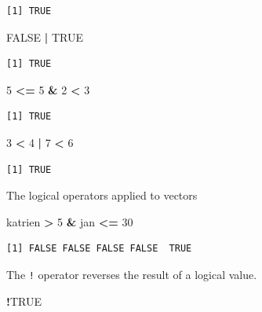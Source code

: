 \documentclass[
]{book}
\newenvironment{Shaded}{\begin{snugshade}}{\end{snugshade}}
\newcommand{\DecValTok}[1]{\textcolor[rgb]{0.00,0.00,0.81}{#1}}
\newcommand{\NormalTok}[1]{#1}
\newcommand{\OperatorTok}[1]{\textcolor[rgb]{0.81,0.36,0.00}{\textbf{#1}}}
\newcommand{\OtherTok}[1]{\textcolor[rgb]{0.56,0.35,0.01}{#1}}
\newcommand{\StringTok}[1]{\textcolor[rgb]{0.31,0.60,0.02}{#1}}
\begin{document}
\begin{verbatim}
[1] TRUE
\end{verbatim}

\begin{Shaded}
\begin{Highlighting}[]
\OtherTok{FALSE} \OperatorTok{|}\StringTok{ }\OtherTok{TRUE}
\end{Highlighting}
\end{Shaded}

\begin{verbatim}
[1] TRUE
\end{verbatim}

\begin{Shaded}
\begin{Highlighting}[]
\DecValTok{5} \OperatorTok{<=}\StringTok{ }\DecValTok{5} \OperatorTok{&}\StringTok{ }\DecValTok{2} \OperatorTok{<}\StringTok{ }\DecValTok{3}
\end{Highlighting}
\end{Shaded}

\begin{verbatim}
[1] TRUE
\end{verbatim}

\begin{Shaded}
\begin{Highlighting}[]
\DecValTok{3} \OperatorTok{<}\StringTok{ }\DecValTok{4} \OperatorTok{|}\StringTok{ }\DecValTok{7} \OperatorTok{<}\StringTok{ }\DecValTok{6}
\end{Highlighting}
\end{Shaded}

\begin{verbatim}
[1] TRUE
\end{verbatim}

The logical operators applied to vectors

\begin{Shaded}
\begin{Highlighting}[]
\NormalTok{katrien }\OperatorTok{>}\StringTok{ }\DecValTok{5} \OperatorTok{&}\StringTok{ }\NormalTok{jan }\OperatorTok{<=}\StringTok{ }\DecValTok{30}
\end{Highlighting}
\end{Shaded}

\begin{verbatim}
[1] FALSE FALSE FALSE FALSE  TRUE
\end{verbatim}

The \texttt{!} operator reverses the result of a logical value.

\begin{Shaded}
\begin{Highlighting}[]
\OperatorTok{!}\OtherTok{TRUE}
\end{Highlighting}
\end{Shaded}
\end{document}
